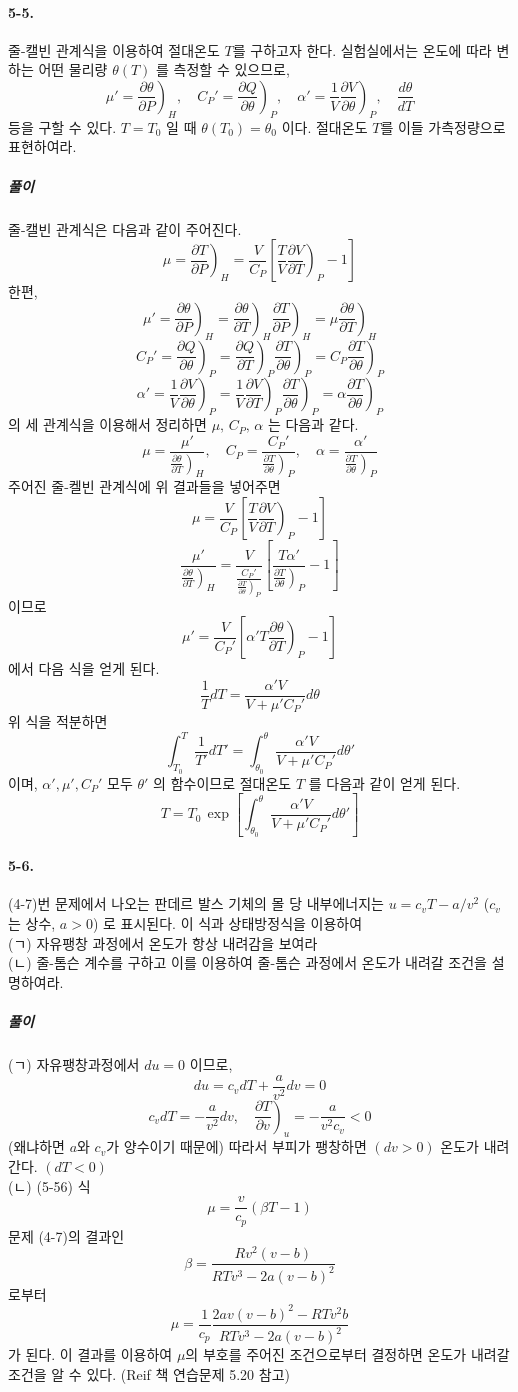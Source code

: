 \documentclass[a4paper,12pt]{report}
\newcommand{\Maxwell}[3][]{\left.\frac{\partial #2}{\partial #3} \right)_{#1} }
\begin{document}
	\paragraph{5-5. } 줄-캘빈 관계식을 이용하여 절대온도 $T$를 구하고자 한다. 실험실에서는 온도에 따라 변하는 어떤 물리량 $\theta(T)$ 를 측정할 수 있으므로, 
	$$\mu'=\Maxwell[H]{\theta}{P},\quad C_P'=\Maxwell[P]{Q}{\theta},\quad \alpha'=\frac{1}{V}\Maxwell[P]{V}{\theta},\quad \frac{d\theta}{dT}$$ 등을 구할 수 있다. $T=T_0$ 일 때 $\theta(T_0)=\theta_0$  이다. 절대온도 $T$를 이들 가측정량으로 표현하여라. 
	\subparagraph{풀이}  줄-캘빈 관계식은 다음과 같이 주어진다.
	$$\mu=\Maxwell[H]{T}{P}=\frac{V}{C_P}\left[\frac{T}{V}\Maxwell[P]{V}{T}-1 \right] $$
	한편,
	$$\mu'=\Maxwell[H]{\theta}{P}=\Maxwell[H]{\theta}{T}\Maxwell[H]{T}{P}=\mu \Maxwell[H]{\theta}{T}$$
	$$C_P'=\Maxwell[P]{Q}{\theta}=\Maxwell[P]{Q}{T}\Maxwell[P]{T}{\theta}=C_P\Maxwell[P]{T}{\theta}$$
	$$\alpha'=\frac{1}{V}\Maxwell[P]{V}{\theta}=\frac{1}{V}\Maxwell[P]{V}{T}\Maxwell[P]{T}{\theta}=\alpha\Maxwell[P]{T}{\theta}$$
	의 세 관계식을 이용해서 정리하면 $\mu,\,C_P,\,\alpha$ 는 다음과 같다.
	$$\mu=\frac{\mu'}{\Maxwell[H]{\theta}{T}},\quad C_P=\frac{C_P'}{\Maxwell[P]{T}{\theta}},\quad\alpha=\frac{\alpha'}{\Maxwell[P]{T}{\theta}}$$
	주어진 줄-켈빈 관계식에 위 결과들을 넣어주면
	$$\mu=\frac{V}{C_P}\left[\frac{T}{V}\Maxwell[P]{V}{T}-1 \right] $$
	$$\frac{\mu'}{\Maxwell[H]{\theta}{T}}=\frac{V}{\frac{C_P'}{\Maxwell[P]{T}{\theta}}}\left[\frac{T\alpha'}{\Maxwell[P]{T}{\theta}}-1 \right] $$
	이므로 
	$$\mu'=\frac{V}{C_P'}\left[\alpha'T\Maxwell[P]{\theta}{T}-1 \right] $$
	에서 다음 식을 얻게 된다.
	$$\frac{1}{T}dT=\frac{\alpha'V}{V+\mu'C_P'}d\theta$$
	위 식을 적분하면
	$$\int_{T_0}^{T}\frac{1}{T'}dT'=\int_{\theta_0}^{\theta}\frac{\alpha'V}{V+\mu'C_P'}d\theta'$$
	이며, $\alpha', \mu', C_P'$ 모두 $\theta'$ 의 함수이므로 절대온도 $T$ 를 다음과 같이 얻게 된다. 
	$$ T=T_0 \,\exp\left[\int_{\theta_0}^{\theta}\frac{\alpha'V}{V+\mu'C_P'}d\theta' \right] $$
	\paragraph{5-6. } (4-7)번 문제에서 나오는 판데르 발스 기체의 몰 당 내부에너지는 $u=c_vT-a/v^2$ ($c_v$ 는 상수, $a>0$) 로 표시된다. 이 식과 상태방정식을 이용하여\\
	(ㄱ) 자유팽창 과정에서 온도가 항상 내려감을 보여라\\
	(ㄴ) 줄-톰슨 계수를 구하고 이를 이용하여 줄-톰슨 과정에서 온도가 내려갈 조건을 설명하여라.
	\subparagraph{풀이} (ㄱ) 자유팽창과정에서 $du=0$ 이므로,
	$$du=c_vdT+\frac{a}{v^2}dv=0$$
	$$c_v dT=-\frac{a}{v^2}dv,\quad \Maxwell[u]{T}{v}=-\frac{a}{v^2c_v}<0$$
	(왜냐하면 $a$와 $c_v$가 양수이기 때문에) 따라서 부피가 팽창하면 $(dv>0)$ 온도가 내려간다. $(dT<0)$\\
	(ㄴ) (5-56) 식
	$$\mu=\frac{v}{c_p}(\beta T-1)$$
	문제 (4-7)의 결과인
	$$\beta=\frac{Rv^2(v-b)}{RTv^3-2a(v-b)^2}$$
	로부터
	$$\mu=\frac{1}{c_p}\frac{2av(v-b)^2-RTv^2b}{RTv^3-2a(v-b)^2}$$ 가 된다. 이 결과를 이용하여 $\mu$의 부호를 주어진 조건으로부터 결정하면 온도가 내려갈 조건을 알 수 있다. (Reif 책 연습문제 5.20 참고) 
\end{document}
